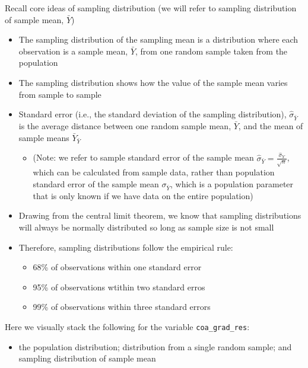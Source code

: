 \documentclass[
  letterpaper,
  DIV=11,
  numbers=noendperiod]{scrartcl}
\providecommand{\tightlist}{%
  \setlength{\itemsep}{0pt}\setlength{\parskip}{0pt}}\usepackage{longtable,booktabs,array}
\begin{document}
Recall core ideas of sampling distribution (we will refer to sampling
distribution of sample mean, \(\bar{Y}\))

\begin{itemize}
\tightlist
\item
  The sampling distribution of the sampling mean is a distribution where
  each observation is a sample mean, \(\bar{Y}\), from one random sample
  taken from the population
\item
  The sampling distribution shows how the value of the sample mean
  varies from sample to sample
\item
  Standard error (i.e., the standard deviation of the sampling
  distribution), \(\hat{\sigma}_{\bar{Y}}\) is the average distance
  between one random sample mean, \(\bar{Y}\), and the mean of sample
  means \(\bar{Y}_{\bar{Y}}\)

  \begin{itemize}
  \tightlist
  \item
    (Note: we refer to sample standard error of the sample mean
    \(\hat{\sigma}_{\bar{Y}} = \frac{\hat{\sigma}_{Y}}{\sqrt{n}}\),
    which can be calculated from sample data, rather than population
    standard error of the sample mean \(\sigma_{\bar{Y}}\), which is a
    population parameter that is only known if we have data on the
    entire population)
  \end{itemize}
\item
  Drawing from the central limit theorem, we know that sampling
  distributions will always be normally distributed so long as sample
  size is not small
\item
  Therefore, sampling distributions follow the empirical rule:

  \begin{itemize}
  \tightlist
  \item
    68\% of observations within one standard error
  \item
    95\% of observations wtithin two standard erros
  \item
    99\% of observations within three standard errors
  \end{itemize}
\end{itemize}

Here we visually stack the following for the variable
\texttt{coa\_grad\_res}:

\begin{itemize}
\tightlist
\item
  the population distribution; distribution from a single random sample;
  and sampling distribution of sample mean
\end{itemize}
\end{document}
